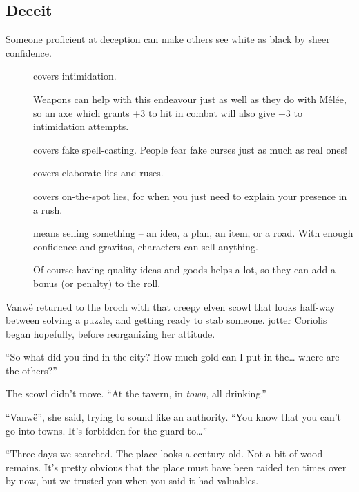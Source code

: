 \begin{multicols}{2}
\subsection{Deceit}

Someone proficient at deception can make others see white as black by sheer confidence.

\begin{description}
  \item[]
    covers intimidation.

    Weapons can help with this endeavour just as well as they do with M\^{e}l\'ee, so an axe which grants +3 to hit in combat will also give +3 to intimidation attempts.
  \item[]
    covers fake spell-casting.
    People fear fake curses just as much as real ones!
  \item[]
    covers elaborate lies and ruses.
  \item[]
    covers on-the-spot lies, for when you just need to explain your presence in a rush.
  \item[]
    means selling something -- an idea, a plan, an item, or a road.
    With enough confidence and gravitas, characters can sell anything.

    Of course having quality ideas and goods helps a lot, so they can add a bonus (or penalty) to the roll.
\end{description}


\begin{exampletext}
  Vanw\"e returned to the \gls{broch} with that creepy elven scowl that looks half-way between solving a puzzle, and getting ready to stab someone.
  \Gls{jotter} Coriolis began hopefully, before reorganizing her attitude.

  ``So what did you find in the city?
  How much gold can I put in the\ldots
  where are the others?''

  The scowl didn't move.
  ``At the tavern, in \emph{town}, all drinking.''

  ``Vanw\"e'', she said, trying to sound like an authority.
  ``You know that you can't go into towns.
  It's forbidden for the \gls{guard} to\ldots''

  ``Three days we searched.
  The place looks a century old.
  Not a bit of wood remains.
  It's pretty obvious that the place must have been raided ten times over by now, but we trusted you when you said it had valuables.


\end{exampletext}
\end{multicols}

